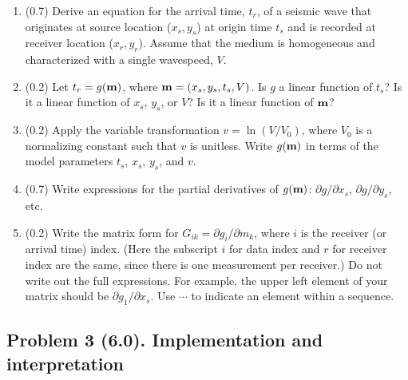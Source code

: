 \documentclass[11pt,titlepage,fleqn]{article}
\begin{document}
\begin{enumerate}
\item (0.7) Derive an equation for the arrival time, $t_r$,  of a seismic wave that originates at source location ($x_s, y_s$) at origin time $t_s$ and is recorded at receiver location ($x_r, y_r$). Assume that the medium is homogeneous and characterized with a single wavespeed, $V$.

\item (0.2) Let $t_r = g(\mbox{${\bf m}$})$, where $\mbox{${\bf m}$} = (x_s,y_s,t_s,V)$.
Is $g$ a linear function of $t_s$? Is it a linear function of $x_s$, $y_s$, or $V$?
Is it a linear function of $\mbox{${\bf m}$}$?

\item (0.2) Apply the variable transformation $v = \ln(V/V_0)$, where $V_0$ is a normalizing constant such that $v$ is unitless. Write $g(\mbox{${\bf m}$})$ in terms of the model parameters $t_s$, $x_s$, $y_s$, and $v$.

\item (0.7) Write expressions for the partial derivatives of $g(\mbox{${\bf m}$})$: $\partial g/ \partial x_s$, $\partial g/ \partial y_s$, etc.

\item (0.2) Write the matrix form for $G_{ik} = \partial g_i/ \partial m_k$, where $i$ is the receiver (or arrival time) index. (Here the subscript $i$ for data index and $r$ for receiver index are the same, since there is one measurement per receiver.) Do not write out the full expressions. For example, the upper left element of your matrix should be $\partial g_1/\partial x_s$. Use $\cdots$ to indicate an element within a sequence.

\end{enumerate}


\subsection*{Problem 3 (6.0). Implementation and interpretation}
\end{document}
